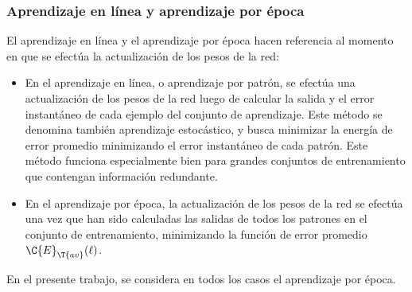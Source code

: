 %
\subsubsection{Aprendizaje en línea y aprendizaje por época}
%
El aprendizaje en línea y el aprendizaje por época hacen referencia
al momento en que se efectúa la actualización de los pesos de la
red:
%
\begin{itemize}
\item En el aprendizaje en línea, o aprendizaje por patrón, se efectúa una
  actualización de los pesos de la red luego de calcular la salida y el
  error instantáneo de cada ejemplo del conjunto de aprendizaje.  Este
  método se denomina también aprendizaje estocástico, y busca
  minimizar la energía de error promedio minimizando el error
  instantáneo de cada patrón.  Este método funciona especialmente bien
  para grandes conjuntos de entrenamiento que contengan información
  redundante.
\item En el aprendizaje por época, la actualización de los pesos de la red
  se efectúa una vez que han sido calculadas las salidas de todos los
  patrones en el conjunto de entrenamiento, minimizando la función de
  error promedio $\C{E}_{\T{av}}(\ell)$.
\end{itemize}
%
En el presente trabajo, se considera en todos los casos el aprendizaje
por época.




